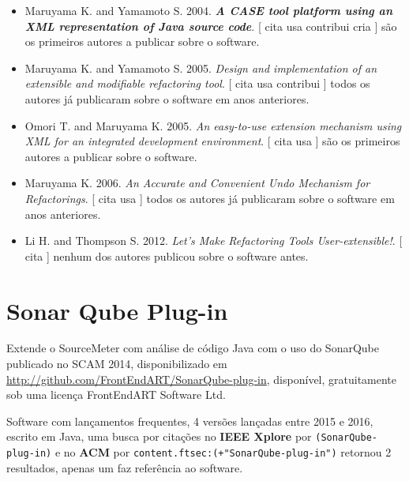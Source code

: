 \begin{itemize}
\item Maruyama K. and Yamamoto S.
      2004.
        \textbf{\textit{ A CASE tool platform using an XML representation of Java source code}}.
      [
          cita
          usa
          contribui
          cria
      ]
são os primeiros autores a publicar sobre o software.
\item Maruyama K. and Yamamoto S.
      2005.
        \textit{ Design and implementation of an extensible and modifiable refactoring tool}.
      [
          cita
          usa
          contribui
      ]
todos os autores já publicaram sobre o software em anos anteriores.
\item Omori T. and Maruyama K.
      2005.
        \textit{ An easy-to-use extension mechanism using XML for an integrated development environment}.
      [
          cita
          usa
      ]
são os primeiros autores a publicar sobre o software.
\item Maruyama K.
      2006.
        \textit{ An Accurate and Convenient Undo Mechanism for Refactorings}.
      [
          cita
          usa
      ]
todos os autores já publicaram sobre o software em anos anteriores.
\item Li H. and Thompson S.
      2012.
        \textit{ Let's Make Refactoring Tools User-extensible!}.
      [
          cita
      ]
nenhum dos autores publicou sobre o software antes.
\end{itemize}
\section{Sonar Qube Plug-in}

Extende o SourceMeter com análise de código Java com o uso do SonarQube
publicado no SCAM 2014,
disponibilizado em \url{http://github.com/FrontEndART/SonarQube-plug-in},
disponível,
gratuitamente
sob uma licença FrontEndART Software Ltd.

Software com lançamentos frequentes,
4 versões lançadas
entre 2015 e 2016,
escrito em Java,
uma busca por citações no {\bf IEEE Xplore} por
\texttt{(SonarQube-plug-in)}
e no {\bf ACM} por
\texttt{content.ftsec:(+"SonarQube-plug-in")}
retornou
2 resultados,
apenas um faz referência ao software.


